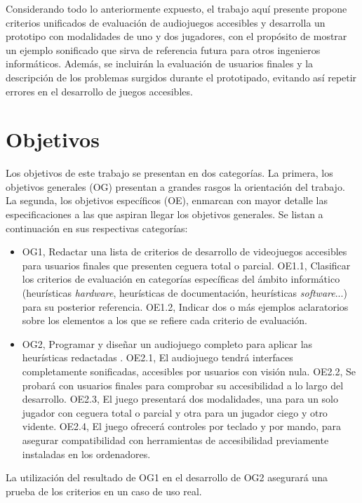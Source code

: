 Considerando todo lo anteriormente expuesto, el trabajo aquí presente propone criterios unificados de evaluación de audiojuegos accesibles y desarrolla un prototipo con modalidades de uno y dos jugadores, con el propósito de mostrar un ejemplo sonificado que sirva de referencia futura para otros ingenieros informáticos. Además, se incluirán la evaluación de usuarios finales y la descripción de los problemas surgidos durante el prototipado, evitando así repetir errores en el desarrollo de juegos accesibles.\\

\section{Objetivos}

Los objetivos de este trabajo se presentan en dos categorías. La primera, los objetivos generales (OG) presentan a grandes rasgos la orientación del trabajo. La segunda, los objetivos específicos (OE), enmarcan con mayor detalle las especificaciones a las que aspiran llegar los objetivos generales. Se listan a continuación en sus respectivas categorías:
\begin{itemize}
	\item OG1, Redactar una lista de criterios de desarrollo de videojuegos accesibles para usuarios finales que presenten ceguera total o parcial.
	\subitem OE1.1, Clasificar los criterios de evaluación en categorías específicas del ámbito informático (heurísticas \textit{hardware}, heurísticas de documentación, heurísticas \textit{software}...) para su posterior referencia.
	\subitem OE1.2, Indicar dos o más ejemplos aclaratorios sobre los elementos a los que se refiere cada criterio de evaluación.
	\item OG2, Programar y diseñar un audiojuego completo para aplicar las heurísticas redactadas .
	\subitem OE2.1, El audiojuego tendrá interfaces completamente sonificadas, accesibles por usuarios con visión nula.
	\subitem OE2.2, Se probará con usuarios finales para comprobar su accesibilidad a lo largo del desarrollo.
	\subitem OE2.3, El juego presentará dos modalidades, una para un solo jugador con ceguera total o parcial y otra para un jugador ciego y otro vidente.
	\subitem OE2.4, El juego ofrecerá controles por teclado y por mando, para asegurar compatibilidad con herramientas de accesibilidad previamente instaladas en los ordenadores.
\end{itemize}
La utilización del resultado de OG1 en el desarrollo de OG2 asegurará una prueba de los criterios en un caso de uso real.
